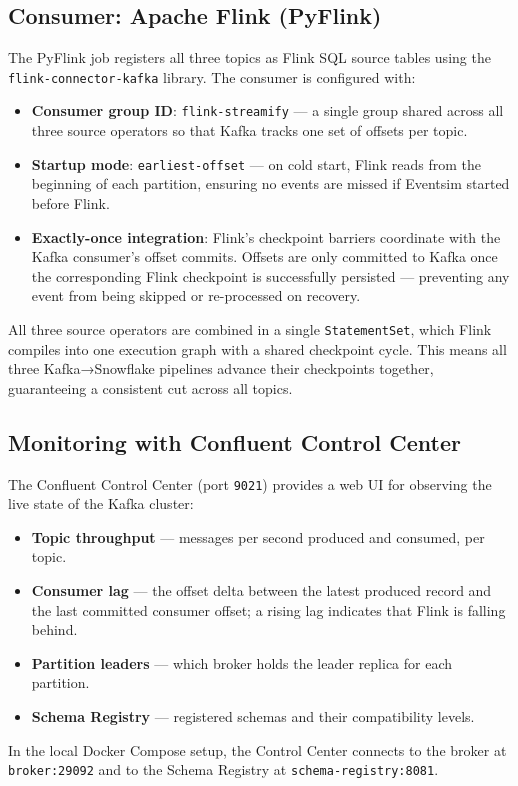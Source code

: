 \subsection{Consumer: Apache Flink (PyFlink)}

The PyFlink job registers all three topics as Flink SQL source tables using the
\texttt{flink-connector-kafka} library.
The consumer is configured with:

\begin{itemize}
  \item \textbf{Consumer group ID}: \texttt{flink-streamify} — a single group shared across
        all three source operators so that Kafka tracks one set of offsets per topic.
  \item \textbf{Startup mode}: \texttt{earliest-offset} — on cold start, Flink reads from the
        beginning of each partition, ensuring no events are missed if Eventsim started before Flink.
  \item \textbf{Exactly-once integration}: Flink's checkpoint barriers coordinate with the
        Kafka consumer's offset commits.
        Offsets are only committed to Kafka once the corresponding Flink checkpoint is
        successfully persisted — preventing any event from being skipped or re-processed
        on recovery.
\end{itemize}

All three source operators are combined in a single \texttt{StatementSet}, which Flink compiles
into one execution graph with a shared checkpoint cycle.
This means all three Kafka→Snowflake pipelines advance their checkpoints together,
guaranteeing a consistent cut across all topics.

\subsection{Monitoring with Confluent Control Center}

The Confluent Control Center (port \texttt{9021}) provides a web UI for observing the live
state of the Kafka cluster:

\begin{itemize}
  \item \textbf{Topic throughput} — messages per second produced and consumed, per topic.
  \item \textbf{Consumer lag} — the offset delta between the latest produced record and the
        last committed consumer offset; a rising lag indicates that Flink is falling behind.
  \item \textbf{Partition leaders} — which broker holds the leader replica for each partition.
  \item \textbf{Schema Registry} — registered schemas and their compatibility levels.
\end{itemize}

In the local Docker Compose setup, the Control Center connects to the broker at
\texttt{broker:29092} and to the Schema Registry at \texttt{schema-registry:8081}.
